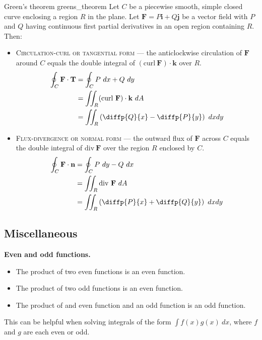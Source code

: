 \begin{theorem}{Green's theorem \cite{thomas_calculus}}{greens_theorem}
Let $C$ be a piecewise smooth, simple closed curve enclosing a region $R$ in the
plane. Let $\mathbf{F} = P \mathbf{i} + Q \mathbf{j}$ be a vector field with $P$ and $Q$ having continuous first partial derivatives in an open region containing $R$. Then:
\begin{itemize}
	\item \textsc{Circulation-curl or tangential form} --- the anticlockwise circulation of $\mathbf{F}$ around $C$ equals the double integral of $(\text{curl} \ \mathbf{F}) \cdot \mathbf{k}$ over $R$.
\begin{align*}
\oint_C \mathbf{F} \cdot \mathbf{T} &= \oint_C P \ dx + Q \ dy \\
&= \iint_R (\text{curl} \ \mathbf{F}) \cdot \mathbf{k} \ dA \\
&= \iint_R \left( \diffp{Q}{x} - \diffp{P}{y} \right) \ dx dy
\end{align*}
	\item \textsc{Flux-divergence or normal form} --- the outward flux of $\mathbf{F}$ across $C$ equals the double integral of $\text{div} \ \mathbf{F}$ over the region $R$ enclosed by $C$.
\begin{align*}
\oint_C \mathbf{F} \cdot \mathbf{n} &= \oint_C P \ dy - Q \ dx \\
&= \iint_R \text{div} \ \mathbf{F} \ dA \\
&= \iint_R \left( \diffp{P}{x} + \diffp{Q}{y} \right) \ dx dy
\end{align*}
\end{itemize}
\end{theorem}

\subsection{Miscellaneous}
\textbf{Even and odd functions.}
\begin{itemize}
	\item The product of two even functions is an even function.
	\item The product of two odd functions is an even function.
	\item The product of and even function and an odd function is an odd function.
\end{itemize}

This can be helpful when solving integrals of the form $\int f(x)g(x) \ dx$, where $f$ and $g$ are each even or odd.